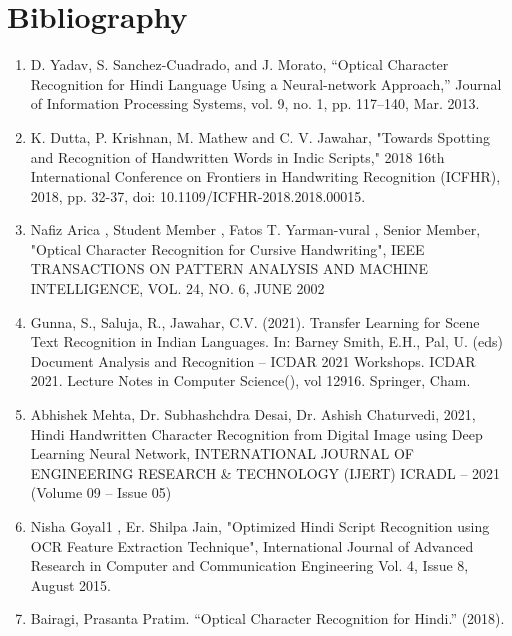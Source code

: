 
\label{chap:bib}
\section{Bibliography}

\begin{enumerate}

\item D. Yadav, S. Sanchez-Cuadrado, and J. Morato, “Optical Character Recognition for Hindi Language Using a Neural-network Approach,” Journal of Information Processing Systems, vol. 9, no. 1, pp. 117–140, Mar. 2013.

\item K. Dutta, P. Krishnan, M. Mathew and C. V. Jawahar, "Towards Spotting and Recognition of Handwritten Words in Indic Scripts," 2018 16th International Conference on Frontiers in Handwriting Recognition (ICFHR), 2018, pp. 32-37, doi: 10.1109/ICFHR-2018.2018.00015.

\item Nafiz Arica , Student Member , Fatos T. Yarman-vural , Senior Member, "Optical Character Recognition for Cursive Handwriting", IEEE TRANSACTIONS ON PATTERN ANALYSIS AND MACHINE INTELLIGENCE, VOL. 24, NO. 6, JUNE 2002

\item Gunna, S., Saluja, R., Jawahar, C.V. (2021). Transfer Learning for Scene Text Recognition in Indian Languages. In: Barney Smith, E.H., Pal, U. (eds) Document Analysis and Recognition – ICDAR 2021 Workshops. ICDAR 2021. Lecture Notes in Computer Science(), vol 12916. Springer, Cham.

\item Abhishek Mehta, Dr. Subhashchdra Desai, Dr. Ashish Chaturvedi, 2021, Hindi Handwritten Character Recognition from Digital Image using Deep Learning Neural Network, INTERNATIONAL JOURNAL OF ENGINEERING RESEARCH & TECHNOLOGY (IJERT) ICRADL – 2021 (Volume 09 – Issue 05)

\item Nisha Goyal1 , Er. Shilpa Jain, "Optimized Hindi Script Recognition using OCR Feature Extraction Technique", International Journal of Advanced Research in Computer and Communication Engineering Vol. 4, Issue 8, August 2015.

\item Bairagi, Prasanta Pratim. “Optical Character Recognition for Hindi.” (2018).

\end{enumerate}